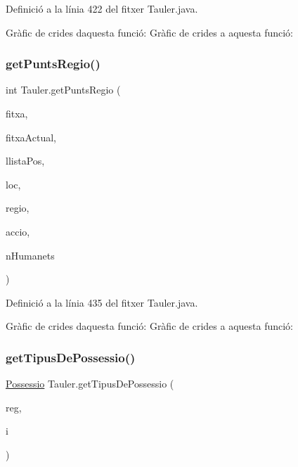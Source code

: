 Definició a la línia 422 del fitxer Tauler.\+java.

Gràfic de crides d\textquotesingle{}aquesta funció\+:
Gràfic de crides a aquesta funció\+:
\mbox{\label{class_tauler_a6e0887ae8dedc793bace05d8b75dfd98}} 
\subsubsection{\texorpdfstring{get\+Punts\+Regio()}{getPuntsRegio()}}
{\footnotesize\ttfamily int Tauler.\+get\+Punts\+Regio (\begin{DoxyParamCaption}\item[{\mbox{\hyperlink{class_fitxa}{Fitxa}}}]{fitxa,  }\item[{\mbox{\hyperlink{class_fitxa}{Fitxa}}}]{fitxa\+Actual,  }\item[{Array\+List$<$ \mbox{\hyperlink{class_possessio}{Possessio}} $>$}]{llista\+Pos,  }\item[{char}]{loc,  }\item[{char}]{regio,  }\item[{String}]{accio,  }\item[{int}]{n\+Humanets }\end{DoxyParamCaption})\hspace{0.3cm}{\ttfamily [private]}}



Definició a la línia 435 del fitxer Tauler.\+java.

Gràfic de crides d\textquotesingle{}aquesta funció\+:
Gràfic de crides a aquesta funció\+:
\mbox{\label{class_tauler_a0595f3ec2a8c32c07fb862a9e723eb99}} 
\subsubsection{\texorpdfstring{get\+Tipus\+De\+Possessio()}{getTipusDePossessio()}}
{\footnotesize\ttfamily \mbox{\hyperlink{class_possessio}{Possessio}} Tauler.\+get\+Tipus\+De\+Possessio (\begin{DoxyParamCaption}\item[{char}]{reg,  }\item[{int}]{i }\end{DoxyParamCaption})\hspace{0.3cm}{\ttfamily [private]}}

